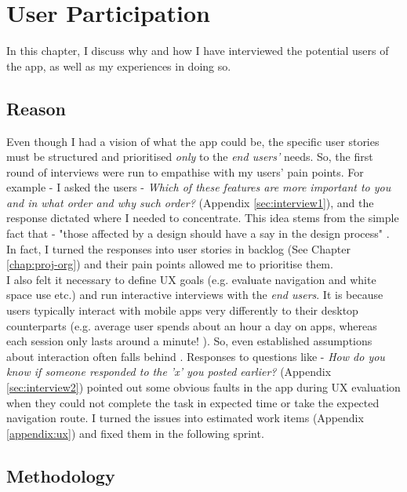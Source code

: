 \chapter{User Participation}
\label{chap:user}

In this chapter, I discuss why and how I have interviewed the potential users of the app, as well as my experiences in doing so.

\section{Reason}

Even though I had a vision of what the app could be, the specific user stories must be structured and prioritised \textit{only} to the \textit{end users'} needs. So, the first round of interviews were run to empathise with my users' pain points. For example - I asked the users - \textit{Which of these features are more important to you and in what order and why such order?} (Appendix \ref{sec:interview1}), and the response dictated where I needed to concentrate. This idea stems from the simple fact that - "those affected by a design should have a say in the design process" \cite{Bjogvinsson:2012}. In fact, I turned the responses into user stories in backlog (See Chapter \ref{chap:proj-org}) and their pain points allowed me to prioritise them.\\

I also felt it necessary to define UX goals (e.g. evaluate navigation and white space use etc.) and run interactive interviews with the \textit{end users}. It is because users typically interact with mobile apps very differently to their desktop counterparts (e.g. average user spends about an hour a day on apps, whereas each session only lasts around a minute! \cite{Bohmer:2011}). So, even established assumptions about interaction often falls behind \cite{Sullivan:2013}. Responses to questions like - \textit{How do you know if someone responded to the ’x’ you posted earlier?} (Appendix \ref{sec:interview2}) pointed out some obvious faults in the app during UX evaluation when they could not complete the task in expected time or take the expected navigation route. I turned the issues into estimated work items (Appendix \ref{appendix:ux}) and fixed them in the following sprint.\\

\section{Methodology}

